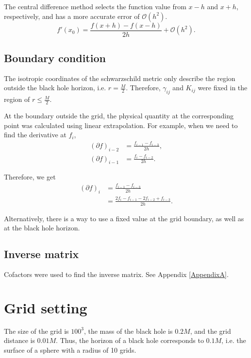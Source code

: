 The central difference method selects the function value from $x-h$ and $x+h$, respectively, and has a more accurate error of $\mathcal{O}(h^2)$.
\begin{equation}
	f'(x_0) = \frac{f(x+ h) - f(x - h)}{2h} + \mathcal{O}(h^2).
\end{equation}

\subsection{Boundary condition}

The isotropic coordinates of the schwarzschild metric only describe the region outside the black hole horizon, i.e. $r=\frac{M}{2}$. Therefore, $\gamma_{ij}$ and $K_{ij}$ were fixed in the region of $r\le \frac{M}{2}$.

At the boundary outside the grid, the physical quantity at the corresponding point was calculated using linear extrapolation. For example, when we need to find the derivative at $f_i$,
\begin{align}
	(\partial f)_{i - 2} &= \frac{f_{i - 1} - f_{i - 3}}{2h},\\
	(\partial f)_{i - 1} &= \frac{f_{i} - f_{i - 2}}{2h}.
\end{align}

Therefore, we get
\begin{equation}
	\begin{aligned}
			(\partial f)_{i} &= \frac{f_{i - 1} - f_{i - 3}}{2h}\\
			&= \frac{2f_i - f_{i - 1} - 2f_{i - 2} + f_{i - 3}}{2h}.
	\end{aligned}
\end{equation}

Alternatively, there is a way to use a fixed value at the grid boundary, as well as at the black hole horizon.

\subsection{Inverse matrix}

Cofactors were used to find the inverse matrix. See Appendix \ref{AppendixA}.

\section{Grid setting}

The size of the grid is $100^3$, the mass of the black hole is $0.2M$, and the grid distance is $0.01M$. Thus, the horizon of a black hole corresponds to $0.1 M$, i.e. the surface of a sphere with a radius of 10 grids.


